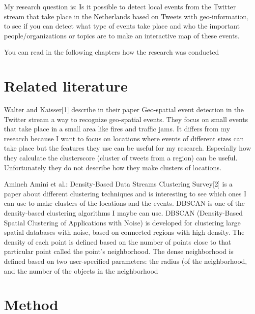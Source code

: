 \documentclass[
10pt, %
a4paper, %
oneside, %
headinclude,footinclude, %
BCOR5mm, %
]{scrartcl}
\begin{document}
My research question is: Is it possible to detect local events from the Twitter stream that take place in the Netherlands based on Tweets with geo-information, to see if you can detect what type of events take place and who the important people/organizations or topics are to make an interactive map of these events.

You can read in the following chapters how the research was conducted


\section{Related literature}
Walter and Kaisser[1] describe in their paper Geo-spatial event detection in the Twitter stream a way to recognize geo-spatial events. They focus on small events that take place in a small area like fires and traffic jams. It differs from my research because I want to focus on locations where events of different sizes can take place but the features they use can be useful for my research. Especially how they calculate the clusterscore (cluster of tweets from a region) can be useful. Unfortunately they do not describe how they make clusters of locations.

Amineh Amini et al.: Density-Based Data Streams Clustering Survey[2] is a paper about different clustering techniques and is interesting to see which ones I can use to make clusters of the locations and the events. DBSCAN is one of the density-based clustering algorithms I maybe can use.  DBSCAN (Density-Based Spatial Clustering of Applications with Noise) is developed for clustering large spatial databases with noise, based on connected regions with high density. The density of each point is defined based on the number of points close to that particular point called the point's neighborhood.
The dense neighborhood is defined based on two user-specified parameters: the radius (of the neighborhood, and the number of the objects in the neighborhood 






\section{Method}
\lipsum[3] %
\end{document}
